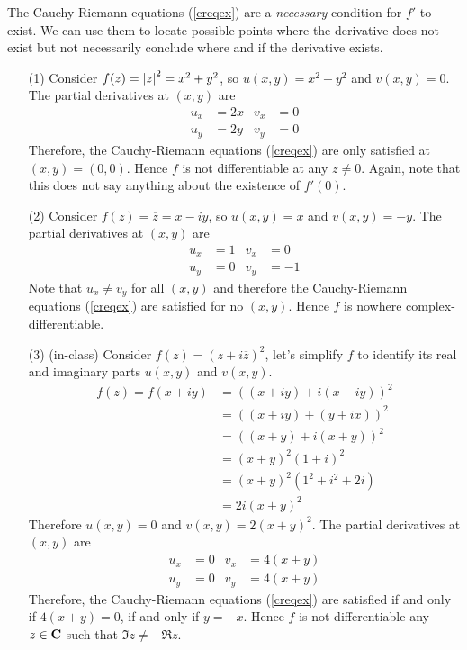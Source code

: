 The Cauchy-Riemann equations (\ref{creqex}) are a \emph{necessary} condition for $f'$ to exist. We can use them to locate possible points where the derivative does not exist but not necessarily conclude where and if the derivative exists.
\begin{example}\label{necessarycr}\hfill
\begin{itemize}
\item[(1)] Consider $f(z) = \left\lvert z\right\rvert^2 = x^2 + y^2$, so $u(x,y) = x^2 + y^2$ and $v(x,y) = 0$. The partial derivatives at $(x,y)$ are
\begin{align*}
u_x &= 2x & v_x &= 0\\[0.5em]
u_y &= 2y & v_y &= 0
\end{align*}
Therefore, the Cauchy-Riemann equations (\ref{creqex}) are only satisfied at $(x,y) = (0,0)$. Hence $f$ is not differentiable at any $z \neq 0$. Again, note that this does not say anything about the existence of $f'(0)$.
\item[(2)] Consider $f(z) = \overline{z} = x - iy$, so $u(x,y) = x$ and $v(x,y) = -y$. The partial derivatives at $(x,y)$ are
\begin{align*}
u_x &= 1 & v_x &= 0\\[0.5em]
u_y &= 0 & v_y &= -1
\end{align*}
Note that $u_x \neq v_y$ for all $(x,y)$ and therefore the Cauchy-Riemann equations (\ref{creqex}) are satisfied for no $(x,y)$. Hence $f$ is nowhere complex-differentiable.
\item[(3)] (in-class) Consider $f(z) = (z + i\overline{z})^2$, let's simplify $f$ to identify its real and imaginary parts $u(x,y)$ and $v(x,y)$.
\begin{align*}
f(z) = f(x + iy) &= ((x + iy) + i(x - iy))^2\\[0.5em]
&= ((x + iy) + (y + ix))^2\\[0.5em]
&= ((x + y) + i(x + y))^2\\[0.5em]
&= (x + y)^2(1 + i)^2\\[0.5em]
&= (x + y)^2(1^2 + i^2 + 2i)\\[0.5em]
&= 2i(x + y)^2
\end{align*}
Therefore $u(x,y) = 0$ and $v(x,y) = 2(x + y)^2$. The partial derivatives at $(x,y)$ are
\begin{align*}
u_x &= 0 & v_x &= 4(x + y)\\[0.5em]
u_y &= 0 & v_y &= 4(x + y)
\end{align*}
Therefore, the Cauchy-Riemann equations (\ref{creqex}) are satisfied if and only if $4(x + y) = 0$, if and only if $y = -x$. Hence $f$ is not differentiable any $z \in \mathbf C$ such that $\Im z \neq -\Re z$.
\end{itemize}
\end{example}

